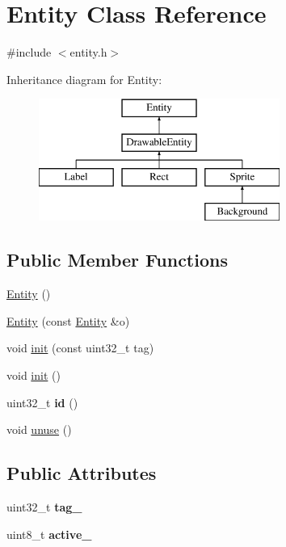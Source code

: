 \hypertarget{class_entity}{}\section{Entity Class Reference}
\label{class_entity}


{\ttfamily \#include $<$entity.\+h$>$}

Inheritance diagram for Entity\+:\begin{figure}[H]
\begin{center}
\leavevmode
\includegraphics[height=4.000000cm]{class_entity}
\end{center}
\end{figure}
\subsection*{Public Member Functions}
\begin{DoxyCompactItemize}
\item 
\hyperlink{class_entity_a980f368aa07ce358583982821533a54a}{Entity} ()
\item 
\hyperlink{class_entity_ad758dc48d715e48ada4193517f1d32ea}{Entity} (const \hyperlink{class_entity}{Entity} \&o)
\item 
void \hyperlink{class_entity_a085fa2dd2c2b1f3f60d601a68d5c6773}{init} (const uint32\+\_\+t tag)
\item 
void \hyperlink{class_entity_a93bfb0b92c06297c207fad4164810fed}{init} ()
\item 
\mbox{\label{class_entity_ae4a75e659a4426f57f5c1d44f1b8ef34}} 
uint32\+\_\+t {\bfseries id} ()
\item 
void \hyperlink{class_entity_ad40f9e3ddaa375d33c930c6b57f4c9c5}{unuse} ()
\end{DoxyCompactItemize}
\subsection*{Public Attributes}
\begin{DoxyCompactItemize}
\item 
\mbox{\label{class_entity_a8003da23696e58c9904b80b952ba802f}} 
uint32\+\_\+t {\bfseries tag\+\_\+}
\item 
\mbox{\label{class_entity_a7816e789062febe058b98ce695539c59}} 
uint8\+\_\+t {\bfseries active\+\_\+}
\end{DoxyCompactItemize}


